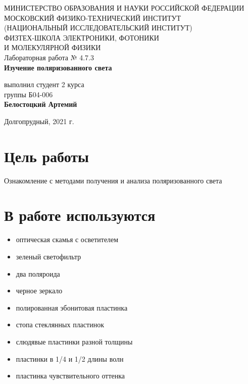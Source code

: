 \documentclass[a4paper,12pt]{article}
\begin{document}
 

\begin{titlepage}
	\begin{center}
		\large 	МИНИСТЕРСТВО ОБРАЗОВАНИЯ И НАУКИ РОССИЙСКОЙ ФЕДЕРАЦИИ\\
				МОСКОВСКИЙ ФИЗИКО-ТЕХНИЧЕСКИЙ ИНСТИТУТ \\
				(НАЦИОНАЛЬНЫЙ ИССЛЕДОВАТЕЛЬСКИЙ ИНСТИТУТ)\\ 
				ФИЗТЕХ-ШКОЛА ЭЛЕКТРОНИКИ, ФОТОНИКИ \\
				И МОЛЕКУЛЯРНОЙ ФИЗИКИ \\
		
		
		\vspace{4.0 cm}
		Лабораторная работа № 4.7.3 \\ 
		\LARGE \textbf{Изучение поляризованного света}
	\end{center}
	\vspace{3 cm} \large
	
	\begin{flushright}
		выполнил студент 2 курса \\
		{группы Б04-006}\\
		\textbf{Белостоцкий Артемий}\\
	\end{flushright}
	
	\vfill

	\begin{center}
	Долгопрудный, 2021 г.
	\end{center}
\end{titlepage}                                                                      

\section*{Цель работы}
Ознакомление с методами получения и анализа поляризованного света

\section*{В работе используются}
\begin{itemize}
\item оптическая скамья с осветителем
\item зеленый светофильтр
\item два поляроида
\item черное зеркало
\item полированная эбонитовая пластинка
\item стопа стеклянных пластинок
\item слюдявые пластинки разной толщины
\item пластинки в 1/4 и 1/2 длины волн
\item пластинка чувствительного оттенка
\end{itemize}
\end{document}
